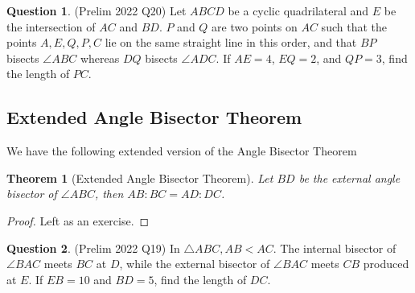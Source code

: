 \documentclass{article}
\newtheorem{theorem}{Theorem}[section]
\theoremstyle{definition}
\newtheorem{question}{Question}
\begin{document}
\begin{question}
	(Prelim 2022 Q20) Let $ABCD$ be a cyclic quadrilateral and $E$ be the intersection of $AC$ and $BD$. $P$ and $Q$ are two points on $AC$ such that the points $A,E,Q,P,C$ lie on the same straight line in this order, and that $BP$ bisects $\angle ABC$ whereas $DQ$ bisects $\angle ADC$. If $AE=4$, $EQ=2$, and $QP=3$, find the length of $PC$.
\end{question}
\newpage

\subsection{Extended Angle Bisector Theorem}
We have the following extended version of the Angle Bisector Theorem

\begin{mdframed}
	\begin{theorem}[Extended Angle Bisector Theorem]
		Let $BD$ be the external angle bisector of $\angle ABC$, then $AB:BC = AD:DC$.
	\end{theorem}
	\begin{figure}[H]
		\centering
	\end{figure}
\end{mdframed}
\begin{proof}
	Left as an exercise.
\end{proof}
\vspace{4cm}
\begin{question}
	(Prelim 2022 Q19) In $\triangle A B C, A B<A C$. The internal bisector of $\angle B A C$ meets $B C$ at $D$, while the external bisector of $\angle B A C$ meets $C B$ produced at $E$. If $EB=10$ and $BD=5$, find the length of $DC$.
\end{question}

\newpage
\end{document}
